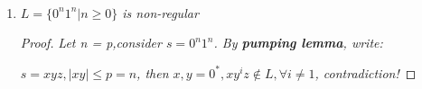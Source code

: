 \documentclass{article}
\begin{document}
\begin{exercises}
    \

    \begin{enumerate}
        \item \textit{$L = \{0^n1^n|n\geq0\}$ is non-regular}
        \begin{proof}
            \textit{Let n = p,consider $s = 0^n1^n$. By \textbf{pumping lemma}, write:}

            \textit{$s = xyz,|xy|\leq p = n$, then $x,y=0^*,xy^iz\notin L, \forall i \neq 1$, contradiction!}
        \end{proof}
    \end{enumerate}
\end{exercises}
\ifx\allfiles\undefined
\end{document}
